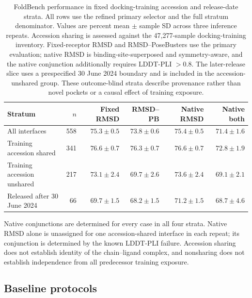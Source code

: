 \documentclass{article}
\begin{document}
\begin{table}[!htbp]
\centering\small
\caption{FoldBench performance in fixed docking-training accession and release-date strata. All rows use the refined primary selector and the full stratum denominator. Values are percent mean $\pm$ sample SD across three inference repeats. Accession sharing is assessed against the 47,277-sample docking-training inventory. Fixed-receptor RMSD and RMSD--PoseBusters use the primary evaluation; native RMSD is binding-site-superposed and symmetry-aware, and the native conjunction additionally requires LDDT-PLI $>0.8$. The later-release slice uses a prespecified 30 June 2024 boundary and is included in the accession-unshared group. These outcome-blind strata describe provenance rather than novel pockets or a causal effect of training exposure.}
\label{tab:si_foldbench_strata}
\begin{tabularx}{\linewidth}{@{}Xrrrrr@{}}
\toprule
Stratum & $n$ & Fixed RMSD & RMSD--PB & Native RMSD & Native both \\
\midrule
All interfaces & 558 & $75.3\pm0.5$ & $73.8\pm0.6$ & $75.4\pm0.5$ & $71.4\pm1.6$ \\
Training accession shared & 341 & $76.6\pm0.7$ & $76.3\pm0.7$ & $76.6\pm0.7$ & $72.8\pm1.9$ \\
Training accession unshared & 217 & $73.1\pm2.4$ & $69.7\pm2.6$ & $73.6\pm2.4$ & $69.1\pm2.1$ \\
Released after 30 June 2024 & 66 & $69.7\pm1.5$ & $68.2\pm1.5$ & $71.2\pm1.5$ & $68.7\pm4.6$ \\
\bottomrule
\end{tabularx}
\end{table}
Native conjunctions are determined for every case in all four strata. Native RMSD alone is unassigned for one accession-shared interface in each repeat; its conjunction is determined by the known LDDT-PLI failure. Accession sharing does not establish identity of the chain--ligand complex, and nonsharing does not establish independence from all predecessor training exposure.

\subsection{Baseline protocols}
\end{document}
